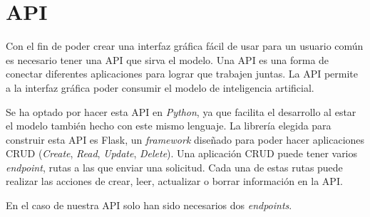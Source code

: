 \documentclass[12pt]{report} %
\begin{document}
	\section{API}
	Con el fin de poder crear una interfaz gráfica fácil de usar para un usuario común es necesario tener una API que sirva el modelo.
	Una API es una forma de conectar diferentes aplicaciones para lograr que trabajen juntas. La API permite
	a la interfaz gráfica poder consumir el modelo de inteligencia artificial.

	Se ha optado por hacer esta API en \textit{Python}, ya que facilita el desarrollo al estar el modelo también hecho con
	este mismo lenguaje. La librería elegida para construir esta API es Flask, un \textit{framework} diseñado para poder hacer
	aplicaciones CRUD (\textit{Create}, \textit{Read}, \textit{Update}, \textit{Delete}). Una aplicación CRUD puede tener varios
	\textit{endpoint}, rutas a las que enviar una solicitud. Cada una de estas rutas puede realizar las acciones 
	de crear, leer, actualizar o borrar información en la API.
	
	En el caso de nuestra API solo han sido necesarios dos \textit{endpoints}.
\end{document}
